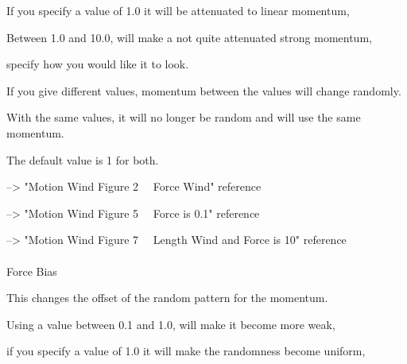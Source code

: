 \documentclass[a4paper,12pt]{article}
\begin{document}
If you specify a value of 1.0 it will be attenuated to linear momentum,\par
Between 1.0 and 10.0, will make a not quite attenuated strong momentum,\par
specify how you would like it to look.\par
If you give different values, momentum between the values will change randomly.\par
With the same values, it will no longer be random and will use the same momentum.\par
The default value is 1 for both.\par
--> "Motion Wind Figure 2 \ \ Force Wind" reference\par
--> "Motion Wind Figure 5 \ \ Force is 0.1" reference\par
--> "Motion Wind Figure 7 \ \ Length Wind and Force is 10" reference\\
\\
Force Bias\par
This changes the offset of the random pattern for the momentum.\par
Using a value between 0.1 and 1.0, will make it become more weak,\par
if you specify a value of 1.0 it will make the randomness become uniform,

\newpage

\thispagestyle{empty}
\end{document}

